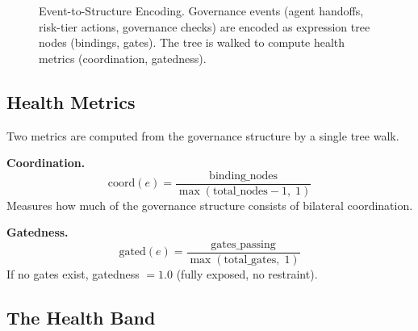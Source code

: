\documentclass[sigconf,nonacm]{acmart}
\begin{document}
\begin{figure}[t]
  \caption{Event-to-Structure Encoding. Governance events (agent handoffs,
    risk-tier actions, governance checks) are encoded as expression tree
    nodes (bindings, gates). The tree is walked to compute
    health metrics (coordination, gatedness).}
  \label{fig:encoding}
\end{figure}


\subsection{Health Metrics}\label{sec:metrics}

Two metrics are computed from the governance structure by a single tree
walk.

\textbf{Coordination.}
\begin{equation}
\mathrm{coord}(e) = \frac{\mathrm{binding\_nodes}}{\max(\mathrm{total\_nodes} - 1,\; 1)}
\end{equation}
Measures how much of the governance structure consists of bilateral
coordination.

\textbf{Gatedness.}
\begin{equation}
\mathrm{gated}(e) = \frac{\mathrm{gates\_passing}}{\max(\mathrm{total\_gates},\; 1)}
\end{equation}
If no gates exist, gatedness $= 1.0$ (fully exposed, no restraint).


\subsection{The Health Band}\label{sec:healthband}
\end{document}
